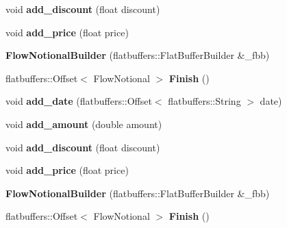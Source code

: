 \begin{DoxyCompactItemize}
void {\bfseries add\+\_\+discount} (float discount)
\item 
\mbox{\label{structquantra_1_1FlowNotionalBuilder_ae55cbbf2db93d750eba52851fafa25f8}} 
void {\bfseries add\+\_\+price} (float price)
\item 
\mbox{\label{structquantra_1_1FlowNotionalBuilder_ac04619c2ce3d2c95a1dcadbe916749f0}} 
{\bfseries Flow\+Notional\+Builder} (flatbuffers\+::\+Flat\+Buffer\+Builder \&\+\_\+fbb)
\item 
\mbox{\label{structquantra_1_1FlowNotionalBuilder_a09e89f044a3682c6ef99b98776083cb9}} 
flatbuffers\+::\+Offset$<$ Flow\+Notional $>$ {\bfseries Finish} ()
\item 
\mbox{\label{structquantra_1_1FlowNotionalBuilder_af2c9d1837a46ee7155a80324000e2283}} 
void {\bfseries add\+\_\+date} (flatbuffers\+::\+Offset$<$ flatbuffers\+::\+String $>$ date)
\item 
\mbox{\label{structquantra_1_1FlowNotionalBuilder_a150732d2e3ad6a520bd64420143c6c64}} 
void {\bfseries add\+\_\+amount} (double amount)
\item 
\mbox{\label{structquantra_1_1FlowNotionalBuilder_aa6d366144beedef59f12e9db505252b2}} 
void {\bfseries add\+\_\+discount} (float discount)
\item 
\mbox{\label{structquantra_1_1FlowNotionalBuilder_ae55cbbf2db93d750eba52851fafa25f8}} 
void {\bfseries add\+\_\+price} (float price)
\item 
\mbox{\label{structquantra_1_1FlowNotionalBuilder_ac04619c2ce3d2c95a1dcadbe916749f0}} 
{\bfseries Flow\+Notional\+Builder} (flatbuffers\+::\+Flat\+Buffer\+Builder \&\+\_\+fbb)
\item 
\mbox{\label{structquantra_1_1FlowNotionalBuilder_a09e89f044a3682c6ef99b98776083cb9}} 
flatbuffers\+::\+Offset$<$ Flow\+Notional $>$ {\bfseries Finish} ()
\end{DoxyCompactItemize}
